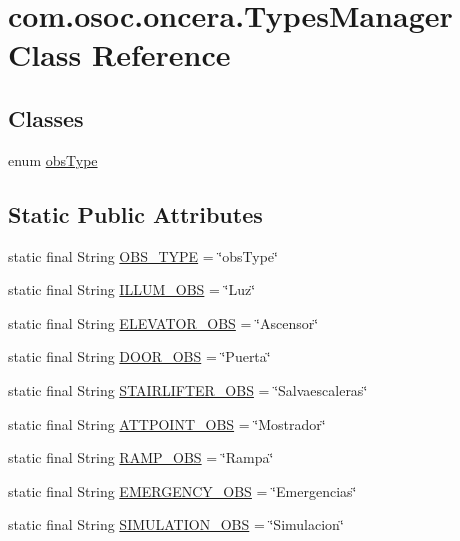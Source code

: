 \hypertarget{classcom_1_1osoc_1_1oncera_1_1_types_manager}{}\section{com.\+osoc.\+oncera.\+Types\+Manager Class Reference}
\label{classcom_1_1osoc_1_1oncera_1_1_types_manager}
\subsection*{Classes}
\begin{DoxyCompactItemize}
\item 
enum \mbox{\hyperlink{enumcom_1_1osoc_1_1oncera_1_1_types_manager_1_1obs_type}{obs\+Type}}
\end{DoxyCompactItemize}
\subsection*{Static Public Attributes}
\begin{DoxyCompactItemize}
\item 
static final String \mbox{\hyperlink{classcom_1_1osoc_1_1oncera_1_1_types_manager_a7af14bf5f3359c8f79208ecdc1f65937}{O\+B\+S\+\_\+\+T\+Y\+PE}} = \char`\"{}obs\+Type\char`\"{}
\item 
static final String \mbox{\hyperlink{classcom_1_1osoc_1_1oncera_1_1_types_manager_ae8f24b5e2020620aed71f859ee5a65e6}{I\+L\+L\+U\+M\+\_\+\+O\+BS}} = \char`\"{}Luz\char`\"{}
\item 
static final String \mbox{\hyperlink{classcom_1_1osoc_1_1oncera_1_1_types_manager_abd6cf3eb6e4c2b30cda59ee77475f458}{E\+L\+E\+V\+A\+T\+O\+R\+\_\+\+O\+BS}} = \char`\"{}Ascensor\char`\"{}
\item 
static final String \mbox{\hyperlink{classcom_1_1osoc_1_1oncera_1_1_types_manager_a0a7ebe04a9765756aaabda43e2071be0}{D\+O\+O\+R\+\_\+\+O\+BS}} = \char`\"{}Puerta\char`\"{}
\item 
static final String \mbox{\hyperlink{classcom_1_1osoc_1_1oncera_1_1_types_manager_a1d188c66c4532707453749a60f653d0f}{S\+T\+A\+I\+R\+L\+I\+F\+T\+E\+R\+\_\+\+O\+BS}} = \char`\"{}Salvaescaleras\char`\"{}
\item 
static final String \mbox{\hyperlink{classcom_1_1osoc_1_1oncera_1_1_types_manager_a935a03bdec891656f0550250db0aa6b2}{A\+T\+T\+P\+O\+I\+N\+T\+\_\+\+O\+BS}} = \char`\"{}Mostrador\char`\"{}
\item 
static final String \mbox{\hyperlink{classcom_1_1osoc_1_1oncera_1_1_types_manager_a9eebf331c46b17a82566bf84fce3ba26}{R\+A\+M\+P\+\_\+\+O\+BS}} = \char`\"{}Rampa\char`\"{}
\item 
static final String \mbox{\hyperlink{classcom_1_1osoc_1_1oncera_1_1_types_manager_a86c7df8e34608035fed4228808e3d552}{E\+M\+E\+R\+G\+E\+N\+C\+Y\+\_\+\+O\+BS}} = \char`\"{}Emergencias\char`\"{}
\item 
static final String \mbox{\hyperlink{classcom_1_1osoc_1_1oncera_1_1_types_manager_a88caa94a1d084d188fe38aa5a362e514}{S\+I\+M\+U\+L\+A\+T\+I\+O\+N\+\_\+\+O\+BS}} = \char`\"{}Simulacion\char`\"{}
\end{DoxyCompactItemize}


